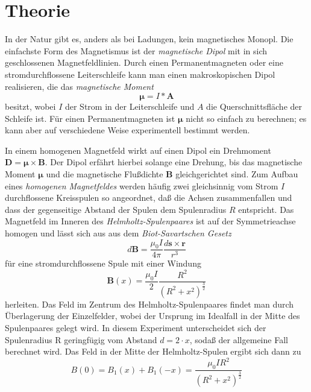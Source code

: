 \section{Theorie}
\label{sec:Theorie}
In der Natur gibt es, anders als bei Ladungen, kein magnetisches Monopl.
Die einfachste Form des Magnetismus ist der \textit{magnetische Dipol} mit in sich geschlossenen Magnetfeldlinien.
Durch einen Permanentmagneten oder eine stromdurchflossene Leiterschleife kann man einen makroskopischen Dipol realisieren,
die das \textit{magnetische Moment}
\begin{equation}
    \symbf{\mu} = I * \symbf{A}
\end{equation}
besitzt, wobei $I$ der Strom in der Leiterschleife und $A$ die Querschnittsfläche der Schleife ist.
Für einen Permanentmagneten ist $\symbf{\mu}$ nicht so einfach zu berechnen; es kann aber auf verschiedene Weise experimentell bestimmt werden.

In einem homogenen Magnetfeld wirkt auf einen Dipol ein Drehmoment $\symbf{D} = \symbf{\mu} \times \symbf{B} $. Der Dipol erfährt hierbei solange eine Drehung, bis das magnetische Moment $\symbf{\mu}$ und die magnetische Flußdichte $\symbf{B}$ gleichgerichtet sind. 
Zum Aufbau eines \textit{homogenen Magnetfeldes} werden häuﬁg zwei gleichsinnig vom Strom $I$ durchﬂossene Kreisspulen so angeordnet, daß die Achsen zusammenfallen und dass der gegenseitige Abstand der Spulen dem Spulenradius $R$ entspricht. 
Das Magnetfeld im Inneren des \textit{Helmholtz-Spulenpaares} ist auf der Symmetrieachse homogen und lässt sich aus aus dem \textit{Biot-Savartschen Gesetz}
\begin{equation}
    d\symbf{B} = \frac{\mu_0 I}{4 \pi} \frac{d\symbf{s} \times \symbf{r}}{r^3}
\end{equation}
für eine stromdurchflossene Spule mit einer Windung
\begin{equation}
    \symbf{B}(x) = \frac{\mu_0 I}{2} \frac{R^2}{(R^2 + x^2)^{\frac{3}{2}}} 
\end{equation}
herleiten. Das Feld im Zentrum des Helmholtz-Spulenpaares ﬁndet man durch Überlagerung der Einzelfelder, wobei der Ursprung im Idealfall in der Mitte des Spulenpaares gelegt wird. 
In diesem Experiment unterscheidet sich der Spulenradius R geringfügig vom Abstand $d = 2·x$, sodaß der allgemeine Fall berechnet wird. Das Feld in der Mitte der Helmholtz-Spulen ergibt sich dann zu
\begin{equation}
    B(0) = B_1 (x) + B_1 (-x) = \frac{\mu_0 I R^2}{(R^2 + x^2)^{\frac{3}{2}}}
\end{equation}


